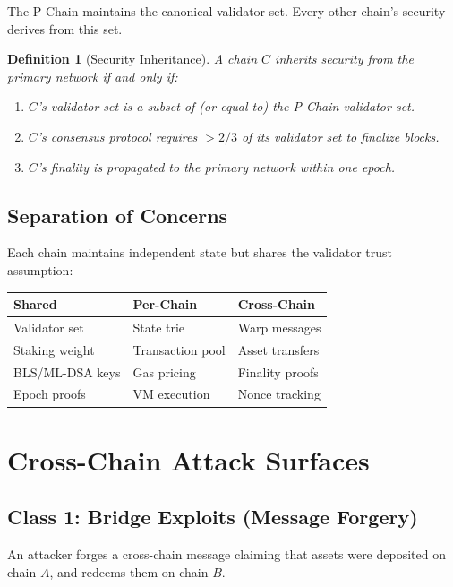 \documentclass[11pt,a4paper]{article}
\newtheorem{definition}{Definition}[section]
\begin{document}
The P-Chain maintains the canonical validator set. Every other chain's security derives from this set.

\begin{definition}[Security Inheritance]
A chain $C$ \emph{inherits security} from the primary network if and only if:
\begin{enumerate}[leftmargin=2em]
\item $C$'s validator set is a subset of (or equal to) the P-Chain validator set.
\item $C$'s consensus protocol requires $>2/3$ of its validator set to finalize blocks.
\item $C$'s finality is propagated to the primary network within one epoch.
\end{enumerate}
\end{definition}

\subsection{Separation of Concerns}

Each chain maintains independent state but shares the validator trust assumption:

\begin{center}
\begin{tabular}{lll}
\toprule
\textbf{Shared} & \textbf{Per-Chain} & \textbf{Cross-Chain} \\
\midrule
Validator set & State trie & Warp messages \\
Staking weight & Transaction pool & Asset transfers \\
BLS/ML-DSA keys & Gas pricing & Finality proofs \\
Epoch proofs & VM execution & Nonce tracking \\
\bottomrule
\end{tabular}
\end{center}

\section{Cross-Chain Attack Surfaces}

\subsection{Class 1: Bridge Exploits (Message Forgery)}

An attacker forges a cross-chain message claiming that assets were deposited on chain $A$, and redeems them on chain $B$.
\end{document}
